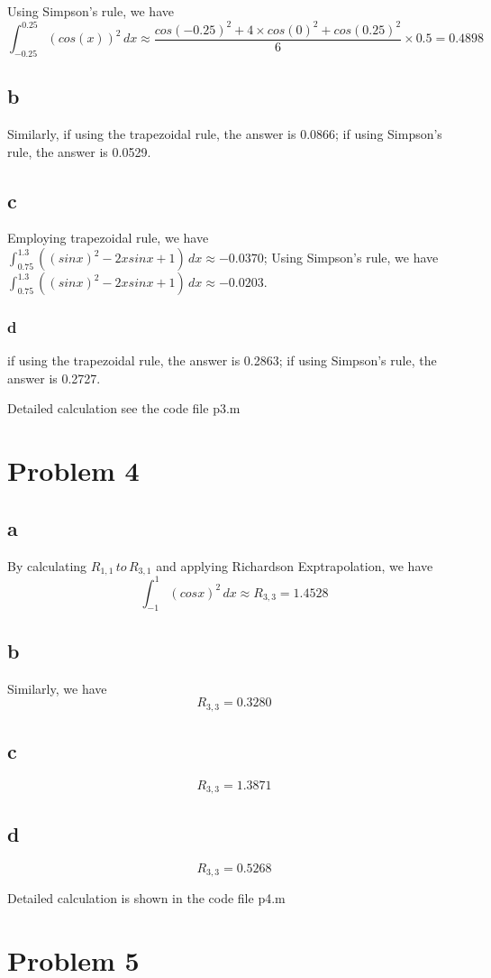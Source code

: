 \documentclass[11pt,a4paper]{report}
\theoremstyle{remark}
\begin{document}
Using Simpson's rule, we have
\[
\int_{-0.25}^{0.25} (cos(x))^2\,dx \approx \frac{cos(-0.25)^2+4\times cos(0)^2+cos(0.25)^2}{6}\times 0.5= 0.4898
\]
\subsection*{b}
Similarly, if using the trapezoidal rule, the answer is 0.0866; if using Simpson's rule, the answer is 0.0529.
\subsection*{c}
Employing trapezoidal rule, we have $\int_{0.75}^{1.3} ((sinx)^2-2xsinx+1) \,dx \approx -0.0370 $; Using Simpson's rule, we have $\int_{0.75}^{1.3} ((sinx)^2-2xsinx+1) \,dx \approx -0.0203 $.
\subsubsection*{d}
 if using the trapezoidal rule, the answer is 0.2863; if using Simpson's rule, the answer is 0.2727.

 Detailed calculation see the code file p3.m

\section*{Problem 4}
\subsection*{a}
By calculating $R_{1,1} \, to \, R_{3,1}$ and applying Richardson Exptrapolation, we have
\[
\int_{-1}^{1} (cos x)^2\,dx \approx R_{3,3} = 1.4528
\]
\subsection*{b}
Similarly, we have
\[
R_{3,3}=0.3280
\]
\subsection*{c}
\[
R_{3,3}=1.3871
\]
\subsection*{d}
\[
R_{3,3}=0.5268
\]

Detailed calculation is shown in the code file p4.m
\section*{Problem 5}
\end{document}

